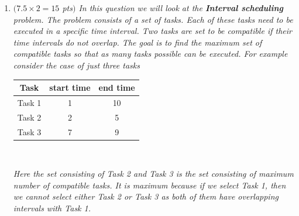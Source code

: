 \documentclass[12pt]{article}
\begin{document}
\begin{enumerate}

	 \item{\itshape $(7.5 \times 2 = 15$ pts$)$ In this question we will look at the \textbf{Interval scheduling} problem. The problem consists of a set of tasks. Each of these tasks need to be executed in a specific time interval. Two tasks are set to be compatible if their time intervals do not overlap. The goal is to find the maximum set of compatible tasks so that as many tasks possible can be executed. For example consider the case of just three tasks\\
	 }
	 \begin{center}
    \begin{tabular}{|c|c|c|}
    \hline
    Task &  start time & end time\\ [0.5ex] 
    \hline \hline 
    Task 1 & 1 & 10 \\
    \hline
    Task 2 & 2 & 5 \\
    \hline
    Task 3 & 7 & 9 \\
    \hline
    \end{tabular} \\
   
\end{center}
{\itshape Here the set consisting of Task 2 and Task 3 is the set consisting of maximum number of compatible tasks. It is maximum because if we select Task 1, then we cannot select either Task 2 or Task 3 as both of them have overlapping intervals with Task 1.} 
 

\end{enumerate}
\end{document}
